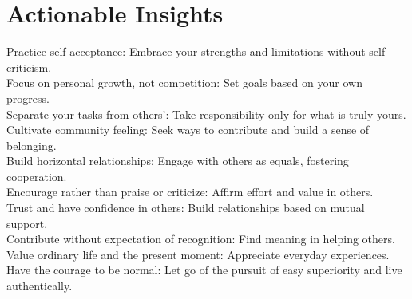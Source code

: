 \section*{Actionable Insights}
\begin{Form}
  \CheckBox[name=01]{} Practice self-acceptance: Embrace your strengths and limitations without self-criticism.\\
  \CheckBox[name=02]{} Focus on personal growth, not competition: Set goals based on your own progress.\\
  \CheckBox[name=03]{} Separate your tasks from others': Take responsibility only for what is truly yours.\\
  \CheckBox[name=04]{} Cultivate community feeling: Seek ways to contribute and build a sense of belonging.\\
  \CheckBox[name=05]{} Build horizontal relationships: Engage with others as equals, fostering cooperation.\\
  \CheckBox[name=06]{} Encourage rather than praise or criticize: Affirm effort and value in others.\\
  \CheckBox[name=07]{} Trust and have confidence in others: Build relationships based on mutual support.\\
  \CheckBox[name=08]{} Contribute without expectation of recognition: Find meaning in helping others.\\
  \CheckBox[name=09]{} Value ordinary life and the present moment: Appreciate everyday experiences.\\
  \CheckBox[name=10]{} Have the courage to be normal: Let go of the pursuit of easy superiority and live authentically.
\end{Form}
